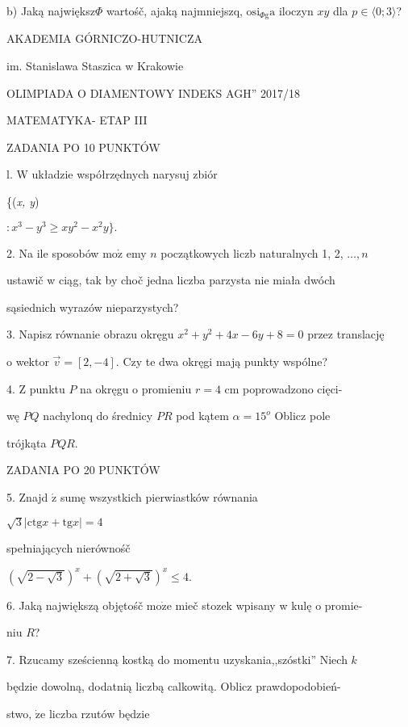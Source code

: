 \documentclass[a4paper,12pt]{article}
\begin{document}
b) Jaką największ$\Phi$ wartośč, ajaką najmniejszq, $\mathrm{o}\mathrm{s}\mathrm{i}_{\Phi \mathrm{g}}\mathrm{a}$ iloczyn $xy$ dla $ p\in\langle 0;3\rangle$?






AKADEMIA GÓRNICZO-HUTNICZA

im. Stanislawa Staszica w Krakowie

OLIMPIADA O DIAMENTOWY INDEKS AGH'' 2017/18

MATEMATYKA- ETAP III

ZADANIA PO 10 PUNKTÓW

l. W układzie współrzędnych narysuj zbiór

\{({\it x, y})

$: x^{3}-y^{3}\geq xy^{2}-x^{2}y\}.$

2. Na ile sposobów $\mathrm{m}\mathrm{o}\dot{\mathrm{z}}$ emy $n$ początkowych liczb naturalnych 1, 2, $\ldots, n$

ustawič w ciąg, tak by choč jedna liczba parzysta nie miała dwóch

sąsiednich wyrazów nieparzystych?

3. Napisz równanie obrazu okręgu $x^{2}+y^{2}+4x-6y+8=0$ przez translację

o wektor $\vec{v}=[2,-4]$. Czy te dwa okręgi mają punkty wspólne?

4. $\mathrm{Z}$ punktu $P$ na okręgu o promieniu $r = 4$ cm poprowadzono cięci-

wę $PQ$ nachylonq do średnicy $PR$ pod kątem $\alpha = 15^{o}$ Oblicz pole

trójkąta $PQR.$

ZADANIA PO 20 PUNKTÓW

5. Znajd $\acute{\mathrm{z}}$ sumę wszystkich pierwiastków równania

$\sqrt{3}|\mathrm{c}\mathrm{t}\mathrm{g}x+\mathrm{t}\mathrm{g}x|=4$

spełniających nierównośč

$(\sqrt{2-\sqrt{3}})^{x}+(\sqrt{2+\sqrt{3}})^{x}\leq 4.$

6. Jaką największą objętośč $\mathrm{m}\mathrm{o}\dot{\mathrm{z}}\mathrm{e}$ mieč stozek wpisany w kulę o promie-

niu $R$?

7. Rzucamy sześcienną kostką do momentu uzyskania,,szóstki'' Niech $k$

będzie dowolną, dodatnią liczbą calkowitą. Oblicz prawdopodobień-

stwo, $\dot{\mathrm{z}}\mathrm{e}$ liczba rzutów będzie
\end{document}
